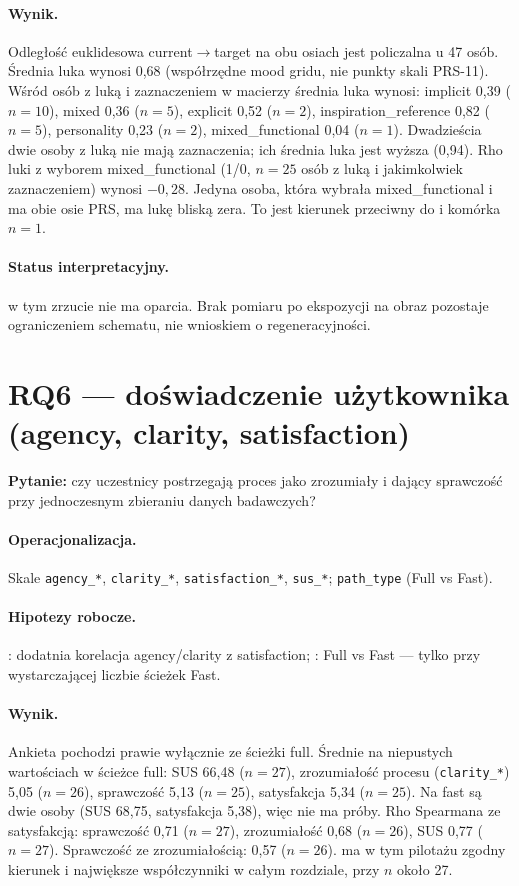 \paragraph{Wynik.}
Odległość euklidesowa current$\rightarrow$target na obu osiach jest policzalna u 47 osób. Średnia luka wynosi 0,68 (współrzędne mood gridu, nie punkty skali PRS-11).
Wśród osób z luką i zaznaczeniem w macierzy średnia luka wynosi: implicit 0,39 ($n=10$), mixed 0,36 ($n=5$), explicit 0,52 ($n=2$), inspiration\_reference 0,82 ($n=5$), personality 0,23 ($n=2$), mixed\_functional 0,04 ($n=1$). Dwadzieścia dwie osoby z luką nie mają zaznaczenia; ich średnia luka jest wyższa (0,94).
Rho luki z wyborem mixed\_functional (1/0, $n=25$ osób z luką i jakimkolwiek zaznaczeniem) wynosi $-0{,}28$. Jedyna osoba, która wybrała mixed\_functional i ma obie osie PRS, ma lukę bliską zera. To jest kierunek przeciwny do  i komórka $n=1$.

\paragraph{Status interpretacyjny.}
 w tym zrzucie nie ma oparcia. Brak pomiaru po ekspozycji na obraz pozostaje ograniczeniem schematu, nie wnioskiem o regeneracyjności.

\section{RQ6 --- doświadczenie użytkownika (agency, clarity, satisfaction)}
\label{ch08:sec:rq6}

\textbf{Pytanie:} czy uczestnicy postrzegają proces jako zrozumiały i dający sprawczość przy jednoczesnym zbieraniu danych badawczych?

\paragraph{Operacjonalizacja.}
{\sloppy Skale \texttt{agency\_*}, \texttt{clarity\_*}, \allowbreak\texttt{satisfaction\_*}, \texttt{sus\_*}; \texttt{path\_type} (Full vs Fast).\par}

\paragraph{Hipotezy robocze.}
: dodatnia korelacja agency/clarity z satisfaction; : Full vs Fast --- tylko przy wystarczającej liczbie ścieżek Fast.

\paragraph{Wynik.}
Ankieta pochodzi prawie wyłącznie ze ścieżki full. Średnie na niepustych wartościach w ścieżce full: SUS 66,48 ($n=27$), zrozumiałość procesu (\texttt{clarity\_*}) 5,05 ($n=26$), sprawczość 5,13 ($n=25$), satysfakcja 5,34 ($n=25$). Na fast są dwie osoby (SUS 68,75, satysfakcja 5,38), więc  nie ma próby.
Rho Spearmana ze satysfakcją: sprawczość 0,71 ($n=27$), zrozumiałość 0,68 ($n=26$), SUS 0,77 ($n=27$). Sprawczość ze zrozumiałością: 0,57 ($n=26$).  ma w tym pilotażu zgodny kierunek i największe współczynniki w całym rozdziale, przy $n$ około 27.

